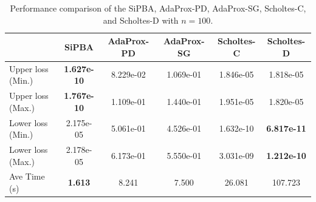 \begin{table}[htbp]
	\caption{Performance comparison of the SiPBA, AdaProx-PD, AdaProx-SG, Scholtes-C, and Scholtes-D with $n=100$.}
	\label{tab:dimension100}
	\scriptsize
	\setlength{\tabcolsep}{3pt}
	\begin{tabular*}{\textwidth}{@{\extracolsep{\fill}}lccccc}
		\hline
		& SiPBA & AdaProx-PD & AdaProx-SG & Scholtes-C & Scholtes-D \\
		\hline
		Upper loss (Min.) & \textbf{1.627e-10} & 8.229e-02 & 1.069e-01 & 1.846e-05 & 1.818e-05 \\
		Upper loss (Max.) & \textbf{1.767e-10} & 1.109e-01 & 1.440e-01 & 1.951e-05 & 1.820e-05 \\
		Lower loss (Min.) & 2.175e-05 & 5.061e-01 & 4.526e-01 & 1.632e-10 & \textbf{6.817e-11} \\
		Lower loss (Max.) & 2.178e-05 & 6.173e-01 & 5.550e-01 & 3.031e-09 & \textbf{1.212e-10} \\
		Ave Time (s) & \textbf{1.613} & 8.241 & 7.500 & 26.081 & 107.723 \\
		\hline
	\end{tabular*}
\end{table}
